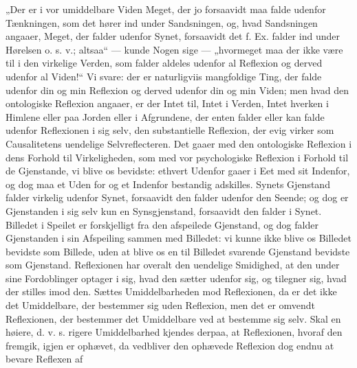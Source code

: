 \documentclass[11pt]{book}
\newcommand{\opage}[1]{\marginnote{\footnotesize\textit{[#1]}}}
\begin{document}
„Der er i vor umiddelbare Viden Meget, der jo forsaavidt maa falde
udenfor Tænkningen, som det hører ind under Sandsningen, og, hvad
Sandsningen angaaer, Meget, der falder udenfor Synet, forsaavidt det f.
Ex. falder ind under Hørelsen o. s. v.; altsaa“ --- kunde Nogen sige ---
„hvormeget maa der ikke være til i den virkelige Verden, som falder
aldeles udenfor al Reflexion og derved udenfor al Viden!“ Vi svare: der
er naturligviis mangfoldige Ting, der falde udenfor din og min Reflexion
og derved udenfor din og min Viden; men hvad den ontologiske Reflexion
angaaer, er der Intet til, Intet i Verden, Intet hverken i Himlene eller
paa Jorden eller i Afgrundene, der enten falder eller kan falde udenfor
Reflexionen i sig selv, den substantielle Reflexion, der evig virker som
Causalitetens uendelige Selvreflecteren. Det gaaer med den ontologiske
Reflexion i dens Forhold til Virkeligheden, som med vor psychologiske
Reflexion i Forhold til de Gjenstande, vi blive os bevidste: ethvert
Udenfor gaaer i Eet med sit Indenfor, og dog maa et Uden\-%
\opage{124} \setcounter{footnote}{0}%
for og et Indenfor bestandig adskilles. Synets Gjenstand falder virkelig
udenfor Synet, forsaavidt den falder udenfor den Seende; og dog er
Gjenstanden i sig selv kun en Synsgjenstand, forsaavidt den falder i Synet.
Billedet i Speilet er forskjelligt fra den afspeilede Gjenstand, og dog falder
Gjenstanden i sin Afspeiling sammen med Billedet: vi kunne ikke blive os
Billedet bevidste som Billede, uden at blive os en til Billedet svarende
Gjenstand bevidste som Gjenstand. Reflexionen har overalt den uendelige
Smidighed, at den under sine Fordoblinger optager i sig, hvad den sætter
udenfor sig, og tilegner sig, hvad der stilles imod den. Sættes
Umiddelbarheden mod Reflexionen, da er det ikke det Umiddelbare, der
bestemmer sig uden Reflexion, men det er omvendt Reflexionen, der bestemmer
det Umiddelbare ved at bestemme sig selv. Skal en høiere, d. v. s. rigere
Umiddelbarhed kjendes derpaa, at Reflexionen, hvoraf den fremgik, igjen er
ophævet, da vedbliver den ophævede Reflexion dog endnu at bevare Reflexen af
\end{document}
